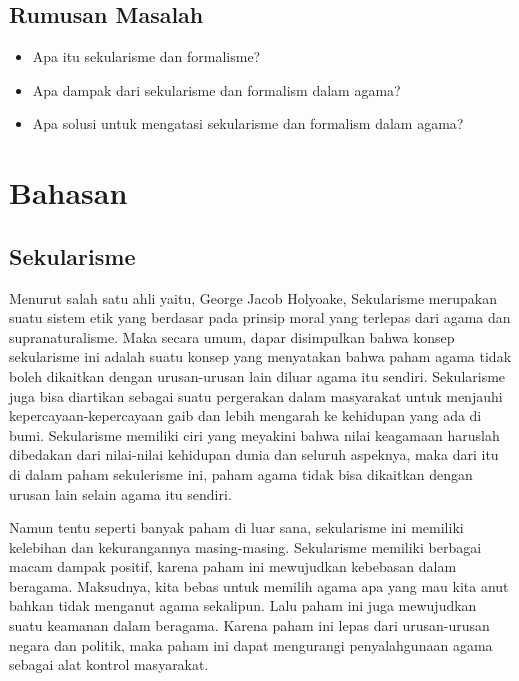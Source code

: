 \documentclass[
  12pt,
]{article}
\begin{document}
    \subsection{Rumusan Masalah}
    \begin{itemize}
      \item Apa itu sekularisme dan formalisme?
      \item Apa dampak dari sekularisme dan formalism dalam agama?
      \item Apa solusi untuk mengatasi sekularisme dan formalism dalam agama?

    \end{itemize}
    \pagebreak

    \section{Bahasan}
    \subsection{Sekularisme}
    Menurut salah satu ahli yaitu, George Jacob Holyoake, Sekularisme merupakan suatu sistem etik yang berdasar pada prinsip moral yang terlepas dari agama dan supranaturalisme. Maka secara umum, dapar disimpulkan bahwa konsep sekularisme ini adalah suatu konsep yang menyatakan bahwa paham agama tidak boleh dikaitkan dengan urusan-urusan lain diluar agama itu sendiri. Sekularisme juga bisa diartikan sebagai suatu pergerakan dalam masyarakat untuk menjauhi kepercayaan-kepercayaan gaib dan lebih mengarah ke kehidupan yang ada di bumi. Sekularisme memiliki ciri yang meyakini bahwa nilai keagamaan haruslah dibedakan dari nilai-nilai kehidupan dunia dan seluruh aspeknya, maka dari itu di dalam paham sekulerisme ini, paham agama tidak bisa dikaitkan dengan urusan lain selain agama itu sendiri.
      
    Namun tentu seperti banyak paham di luar sana, sekularisme ini memiliki kelebihan dan kekurangannya masing-masing. Sekularisme memiliki berbagai macam dampak positif, karena paham ini mewujudkan kebebasan dalam beragama. Maksudnya, kita bebas untuk memilih agama apa yang mau kita anut bahkan tidak menganut agama sekalipun. Lalu paham ini juga mewujudkan suatu keamanan dalam beragama. Karena paham ini lepas dari urusan-urusan negara dan politik, maka paham ini dapat mengurangi penyalahgunaan agama sebagai alat kontrol masyarakat. 
      
\end{document}
